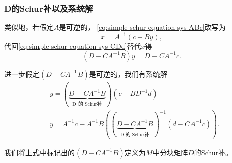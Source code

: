 \begin{subappendices}
\subsubsection{D的Schur补以及系统解}
类似地，若假定$A$是可逆的，
\eqref{eq:simple-schur-equation-sys-ABc}改写为
\begin{equation*}
  x= A^{-1} \left( c - B y \right),
\end{equation*}
代回\eqref{eq:simple-schur-equation-sys-CDd}替代$x$得
\begin{equation*}
    \left( D - CA^{-1} B \right) y = D - C A^{-1} c.
\end{equation*}

进一步假定$\left( D - CA^{-1} B \right)$是可逆的，我们有系统解
\begin{subequations}
  \begin{align}
    \label{eq:simple-schur-D-solution-y}
    &y = \left( \underbrace{D - CA^{-1} B}_{\text{D 的 Schur补}}\right) \left( c - BD^{-1} d \right)\\
    \label{eq:simple-schur-D-solution-x}
    &y=A^{-1} c - A^{-1} B \left( \left(\underbrace{D-CA^{-1}B}_{\text{D 的 Schur补}}\right)^{-1} \left(d - CA^{-1}c\right) \right).
  \end{align}
\end{subequations}

我们将上式中标记出的$\left(D - CA^{-1} B \right)$定义为$M$中分块矩阵$D$的Schur补。


\end{subappendices}
